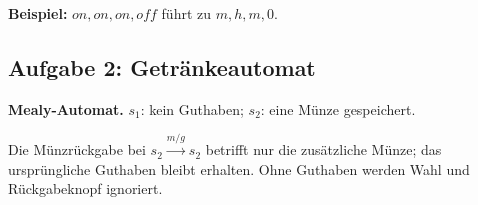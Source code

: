 \textbf{Beispiel:} $on,on,on,off$ führt zu $m,h,m,0$.
\newpage
\subsection*{Aufgabe 2: Getränkeautomat}
\textbf{Mealy-Automat.} $s_1$: kein Guthaben; $s_2$: eine Münze gespeichert.
\begin{center}
\end{center}
Die Münzrückgabe bei $s_2\xrightarrow{m/g}s_2$ betrifft nur die zusätzliche Münze; das ursprüngliche Guthaben bleibt erhalten. Ohne Guthaben werden Wahl und Rückgabeknopf ignoriert.

